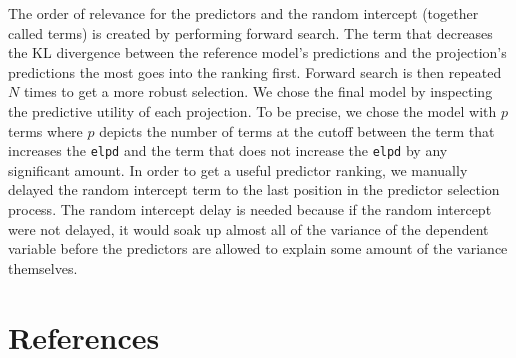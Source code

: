 \documentclass[
  man,floatsintext]{apa6}
\begin{document}
The order of relevance for the predictors and the random intercept (together called terms) is created by performing forward search. The term that decreases the KL divergence between the reference model's predictions and the projection's predictions the most goes into the ranking first. Forward search is then repeated \(N\) times to get a more robust selection. We chose the final model by inspecting the predictive utility of each projection. To be precise, we chose the model with \(p\) terms where \(p\) depicts the number of terms at the cutoff between the term that increases the \texttt{elpd} and the term that does not increase the \texttt{elpd} by any significant amount. In order to get a useful predictor ranking, we manually delayed the random intercept term to the last position in the predictor selection process. The random intercept delay is needed because if the random intercept were not delayed, it would soak up almost all of the variance of the dependent variable before the predictors are allowed to explain some amount of the variance themselves.

\newpage

\hypertarget{references}{%
\section{References}\label{references}}

\begingroup
\setlength{\parindent}{-0.5in}
\setlength{\leftskip}{0.5in}
\end{document}
